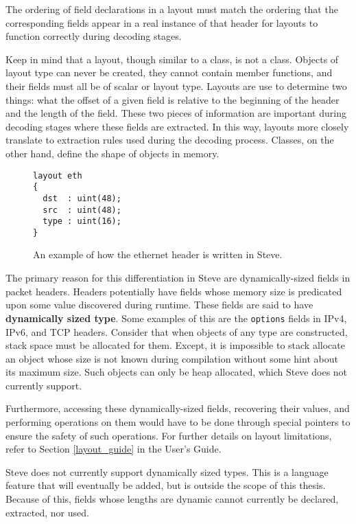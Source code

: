 The ordering of field declarations in a layout must match the ordering that the corresponding fields appear in a real instance of that header for layouts to function correctly during decoding stages. 

Keep in mind that a layout, though similar to a class, is not a class. Objects of layout type can never be created, they cannot contain member functions, and their fields must all be of scalar or layout type. Layouts are use to determine two things: what the offset of a given field is relative to the beginning of the header and the length of the field. These two pieces of information are important during decoding stages where these fields are extracted. In this way, layouts more closely translate to extraction rules used during the decoding process. Classes, on the other hand, define the shape of objects in memory.

\begin{figure}
\begin{lstlisting}
layout eth
{
  dst  : uint(48);
  src  : uint(48);
  type : uint(16);
}
\end{lstlisting}
\caption{An example of how the ethernet header is written in Steve.}
\label{fg:ethernet_layout_ex}
\end{figure}

The primary reason for this differentiation in Steve are dynamically-sized fields in packet headers. Headers potentially have fields whose memory size is predicated upon some value discovered during runtime. These fields are said to have \textbf{dynamically sized type}. Some examples of this are the \texttt{options} fields in IPv4, IPv6, and TCP headers. Consider that when objects of any type are constructed, stack space must be allocated for them. Except, it is impossible to stack allocate an object whose size is not known during compilation without some hint about its maximum size. Such objects can only be heap allocated, which Steve does not currently support. 

Furthermore, accessing these dynamically-sized fields, recovering their values, and performing operations on them would have to be done through special pointers to ensure the safety of such operations. For further details on layout limitations, refer to Section \ref{layout_guide} in the User's Guide.

Steve does not currently support dynamically sized types. This is a language feature that will eventually be added, but is outside the scope of this thesis. Because of this, fields whose lengths are dynamic cannot currently be declared, extracted, nor used. 

